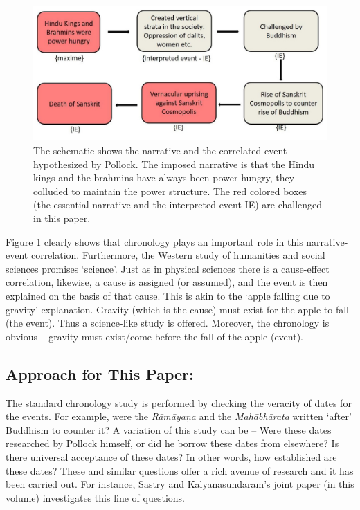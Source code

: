 \begin{figure}[!h]
\includegraphics[scale=.22]{images/chap7-1.jpg}
\caption{The schematic shows the narrative and the correlated event hypothesized by Pollock. The imposed narrative is that the Hindu kings and the brahmins have always been power hungry, they colluded to maintain the power structure. The red colored boxes (the essential narrative and the interpreted event {IE}) are challenged in this paper.}\label{chap7-fig1}
\end{figure}

Figure 1 clearly shows that chronology plays an important role in this narrative-event correlation. Furthermore, the Western study of humanities and social sciences promises ‘science’. Just as in physical sciences there is a cause-effect correlation, likewise, a cause is assigned (or assumed), and the event is then explained on the basis of that cause. This is akin to the ‘apple falling due to gravity’ explanation. Gravity (which is the cause) must exist for the apple to fall (the event). Thus a science-like study is offered. Moreover, the chronology is obvious – gravity must exist/come before the fall of the apple (event).

\subsection*{Approach for This Paper:}

The standard chronology study is performed by checking the veracity of dates for the events. For example, were the \textit{Rāmāyaṇa} and the \textit{Mahābhārata} written ‘after’ Buddhism to counter it? A variation of this study can be – Were these dates researched by Pollock himself, or did he borrow these dates from elsewhere? Is there universal acceptance of these dates? In other words, how established are these dates? These and similar questions offer a rich avenue of research and it has been carried out. For instance, Sastry and Kalyanasundaram’s joint paper (in this volume) investigates this line of questions.

